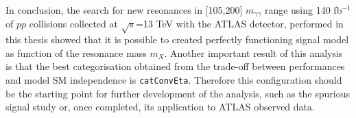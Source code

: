 \documentclass[a4paper, oneside, 11pt, openright]{book}
\begin{document}
		In conclusion, the search for new resonances in [105,200] $m_{\gamma\gamma}$ range using 140 fb$^{-1}$ of $pp$ collisions collected at $\sqrt{s}$=13 TeV with the ATLAS detector, performed in this thesis showed that it is possible to created perfectly functioning signal model as function of the resonance mass $m_X$. Another important result of this analysis is that the best categorisation obtained from the trade-off between performances and model SM independence is \texttt{catConvEta}. Therefore this configuration should be the starting point for further development of the analysis, such as the spurious signal study or, once completed, its application to ATLAS observed data. 
 				
 				
	\newpage
	
	
	
\end{document}
